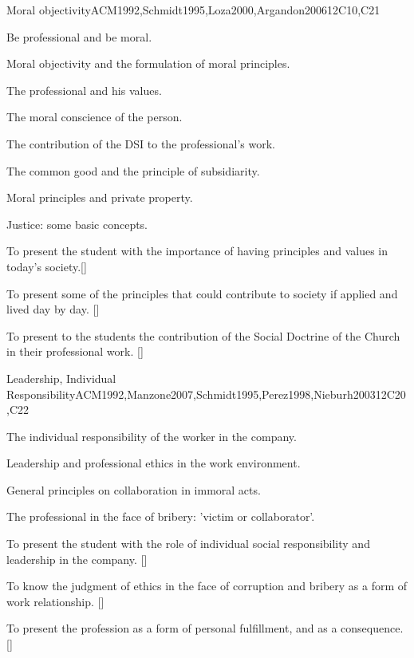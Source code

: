\begin{syllabus}
\begin{unit}{}{Moral objectivity}{ACM1992,Schmidt1995,Loza2000,Argandon2006}{12}{C10,C21}
\begin{topics}
	\item Be professional and be moral.
	\item Moral objectivity and the formulation of moral principles.
	\item The professional and his values.
	\item The moral conscience of the person.
	\item The contribution of the DSI to the professional's work.
	\item The common good and the principle of subsidiarity.
	\item Moral principles and private property.
	\item Justice: some basic concepts.
\end{topics}
\begin{learningoutcomes}
	\item To present the student with the importance of having principles and values in today's society.[\Usage]
	\item To present some of the principles that could contribute to society if applied and lived day by day. [\Usage]
	\item To present to the students the contribution of the Social Doctrine of the Church in their professional work. [\Usage]
\end{learningoutcomes}
\end{unit}

\begin{unit}{}{Leadership, Individual Responsibility}{ACM1992,Manzone2007,Schmidt1995,Perez1998,Nieburh2003}{12}{C20,C22}
\begin{topics}
	\item The individual responsibility of the worker in the company.
	\item Leadership and professional ethics in the work environment.
	\item General principles on collaboration in immoral acts.
	\item The professional in the face of bribery: 'victim or collaborator'.

\end{topics}
\begin{learningoutcomes}
	\item To present the student with the role of individual social responsibility and leadership in the company. [\Familiarity]
	\item To know the judgment of ethics in the face of corruption and bribery as a form of work relationship. [\Familiarity]
	\item To present the profession as a form of personal fulfillment, and as a consequence. []
\end{learningoutcomes}
\end{unit}


\end{syllabus}
